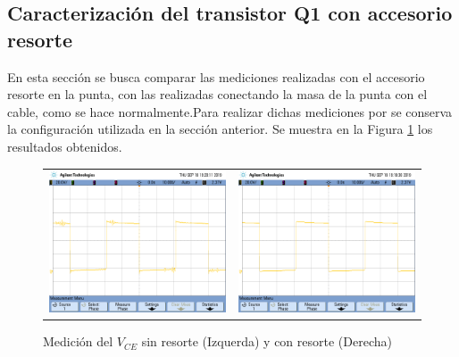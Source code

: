 \subsection{Caracterizaci\'on del transistor Q1 con accesorio resorte}
En esta secci\'on se busca comparar las mediciones realizadas con el accesorio resorte en la punta, con las realizadas conectando la masa de la punta con el cable, como se hace normalmente.Para realizar dichas mediciones por se conserva la configuraci\'on utilizada en la secci\'on anterior.
Se muestra en la Figura \ref{fig:c/s_res} los resultados obtenidos.
\begin{figure}[H]
    \centering
    \begin{tabular}{c c}
        \includegraphics[scale=0.2]{../Mediciones/scope_2.png} &
        \includegraphics[scale=0.2]{../Mediciones/scope_0.png}  
    \end{tabular}
    \caption{Medici\'on del $V_{CE}$ sin resorte (Izquerda) y con resorte (Derecha)}
    \label{fig:c/s_res}

\end{figure}
